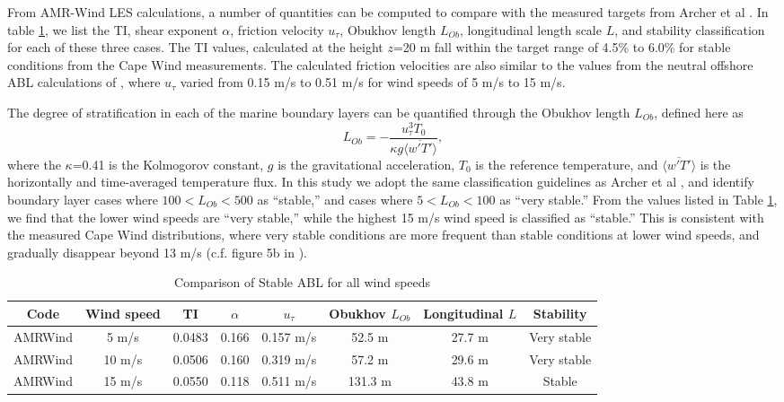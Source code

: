 From AMR-Wind LES calculations, a number of quantities can be computed
to compare with the measured targets from Archer et al
\cite{archer2016predominance}.  In
table \ref{tab:CompareAMRallWS}, we list the TI, shear exponent
$\alpha$, friction velocity $u_\tau$, Obukhov length $L_{Ob}$,
longitudinal length scale $L$, and stability classification for each of
these three cases.  The TI values, calculated at the height $z$=20 m
fall within the target range of 4.5\% to 6.0\% for stable conditions
from the Cape Wind measurements.  The calculated friction velocities
are also similar to the values from the neutral offshore ABL
calculations of \cite{cheung2020large}, where $u_\tau$ varied from
0.15 m/s to 0.51 m/s for wind speeds of 5 m/s to 15 m/s.

The degree of stratification in each of the marine boundary layers can
be quantified through the Obukhov length $L_{Ob}$, defined here as
\begin{equation}
  L_{Ob} = -\frac{u_\tau^3 T_0}{\kappa g \langle \overline{w'T'} \rangle},
\end{equation}
where the $\kappa$=0.41 is the Kolmogorov constant, $g$ is the
gravitational acceleration, $T_0$ is the reference temperature, and
$\langle \overline{w'T'} \rangle$ is the horizontally and
time-averaged temperature flux.  In this study we adopt the same
classification guidelines as Archer et al
\cite{archer2016predominance}, and identify boundary layer cases where
$100 < L_{Ob} < 500$ as ``stable,'' and cases where $5 < L_{Ob}<100$
as ``very stable.''  From the values listed in Table
\ref{tab:CompareAMRallWS}, we find that the lower wind speeds are
``very stable,'' while the highest 15 m/s wind speed is classified as
``stable.''  This is consistent with the measured Cape Wind
distributions, where very stable conditions are more frequent than
stable conditions at lower wind speeds, and gradually disappear beyond
13 m/s (c.f. figure 5b in \cite{archer2016predominance}).

\begin{table}
\caption{\label{tab:CompareAMRallWS} Comparison of Stable ABL for all
  wind speeds} \centering
\begin{tabular}{cccccccc}
  \hline
  Code & Wind speed   & TI     & $\alpha$& $u_\tau$ & Obukhov $L_{Ob}$ & Longitudinal $L$ & Stability \\
  \hline
  AMRWind & 5 m/s      & 0.0483 &  0.166 &  0.157 m/s  &  52.5 m & 27.7 m  & Very stable\\
  AMRWind & 10 m/s     & 0.0506 &  0.160 &  0.319 m/s  &  57.2 m & 29.6 m  & Very stable\\
  AMRWind & 15 m/s     & 0.0550 &  0.118 &  0.511 m/s  & 131.3 m & 43.8 m  & Stable \\
  \hline
\end{tabular}
\end{table}

